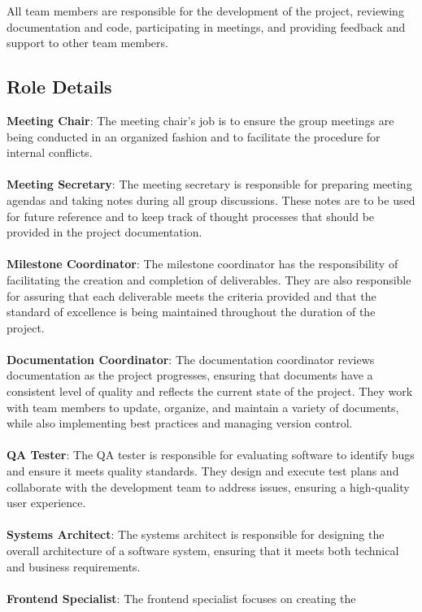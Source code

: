\documentclass{article}
\begin{document}
All team members are responsible for the development of the project, reviewing
documentation and code, participating in meetings, and providing feedback and
support to other team members.

\subsection{Role Details}

\textbf{Meeting Chair}: The meeting chair's job is to ensure the group meetings
are being conducted in an organized fashion and to facilitate the procedure for
internal conflicts. \\
\\
\textbf{Meeting Secretary}: The meeting secretary is responsible for preparing
meeting agendas and taking notes during all group discussions. These notes are
to be used for future reference and to keep track of thought processes that
should be provided in the project documentation. \\
\\
\textbf{Milestone Coordinator}: The milestone coordinator has the responsibility
of facilitating the creation and completion of deliverables. They are also
responsible for assuring that each deliverable meets the criteria provided and
that the standard of excellence is being maintained throughout the duration of
the project. \\
\\
\textbf{Documentation Coordinator}: The documentation coordinator reviews
documentation as the project progresses, ensuring that documents have a
consistent level of quality and reflects the current state of the project. They
work with team members to update, organize, and maintain a variety of documents,
while also implementing best practices and managing version control. \\
\\
\textbf{QA Tester}: The QA tester is responsible for evaluating software to
identify bugs and ensure it meets quality standards. They design and execute
test plans and collaborate with the development team to address issues, ensuring
a high-quality user experience. \\
\\
\textbf{Systems Architect}: The systems architect is responsible for designing
the overall architecture of a software system, ensuring that it meets both
technical and business requirements. \\
\\
\textbf{Frontend Specialist}: The frontend specialist focuses on creating the
\end{document}

